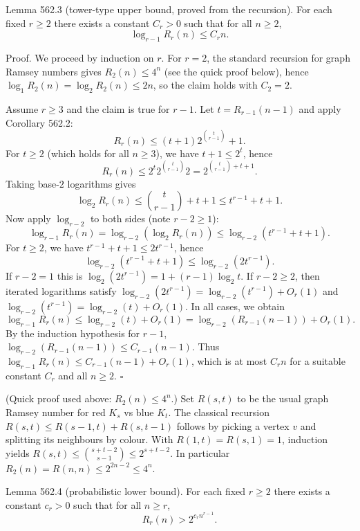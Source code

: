 Lemma 562.3 (tower-type upper bound, proved from the recursion).
For each fixed $r\ge 2$ there exists a constant $C_r>0$ such that for all $n\ge 2$,
\[
\log_{r-1} R_r(n) \le C_r n.
\]

Proof.
We proceed by induction on $r$.
For $r=2$, the standard recursion for graph Ramsey numbers gives $R_2(n)\le 4^n$ (see the quick proof below), hence
$\log_1 R_2(n)=\log_2 R_2(n)\le 2n$, so the claim holds with $C_2=2$.

Assume $r\ge 3$ and the claim is true for $r-1$.
Let $t=R_{r-1}(n-1)$ and apply Corollary 562.2:
\[
R_r(n) \le (t+1)2^{\binom{t}{r-1}} + 1.
\]
For $t\ge 2$ (which holds for all $n\ge 3$), we have $t+1\le 2^t$, hence
\[
R_r(n) \le 2^t 2^{\binom{t}{r-1}} 2 = 2^{\binom{t}{r-1}+t+1}.
\]
Taking base-$2$ logarithms gives
\[
\log_2 R_r(n) \le \binom{t}{r-1}+t+1 \le t^{r-1} + t + 1.
\]
Now apply $\log_{r-2}$ to both sides (note $r-2\ge 1$):
\[
\log_{r-1} R_r(n) = \log_{r-2}(\log_2 R_r(n)) \le \log_{r-2}(t^{r-1}+t+1).
\]
For $t\ge 2$, we have $t^{r-1}+t+1\le 2t^{r-1}$, hence
\[
\log_{r-2}(t^{r-1}+t+1) \le \log_{r-2}(2t^{r-1}).
\]
If $r-2=1$ this is $\log_2(2t^{r-1}) = 1+(r-1)\log_2 t$.
If $r-2\ge 2$, then iterated logarithms satisfy $\log_{r-2}(2t^{r-1}) = \log_{r-2}(t^{r-1}) + O_r(1)$ and $\log_{r-2}(t^{r-1}) = \log_{r-2}(t)+O_r(1)$.
In all cases, we obtain
\[
\log_{r-1} R_r(n) \le \log_{r-2}(t) + O_r(1) = \log_{r-2}(R_{r-1}(n-1)) + O_r(1).
\]
By the induction hypothesis for $r-1$, $\log_{r-2}(R_{r-1}(n-1))\le C_{r-1}(n-1)$.
Thus $\log_{r-1} R_r(n) \le C_{r-1}(n-1)+O_r(1)$, which is at most $C_r n$ for a suitable constant $C_r$ and all $n\ge 2$. \hfill$\square$

(Quick proof used above: $R_2(n)\le 4^n$.)
Set $R(s,t)$ to be the usual graph Ramsey number for red $K_s$ vs blue $K_t$.
The classical recursion $R(s,t)\le R(s-1,t)+R(s,t-1)$ follows by picking a vertex $v$ and splitting its neighbours by colour.
With $R(1,t)=R(s,1)=1$, induction yields $R(s,t)\le \binom{s+t-2}{s-1}\le 2^{s+t-2}$.
In particular $R_2(n)=R(n,n)\le 2^{2n-2}\le 4^n$.

Lemma 562.4 (probabilistic lower bound).
For each fixed $r\ge 2$ there exists a constant $c_r>0$ such that for all $n\ge r$,
\[
R_r(n) > 2^{c_r n^{r-1}}.
\]

